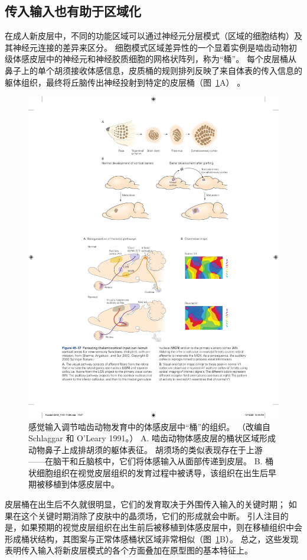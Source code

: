 \subsection{传入输入也有助于区域化}

在成人新皮层中，不同的功能区域可以通过神经元分层模式（区域的细胞结构）及其神经元连接的差异来区分。
细胞模式区域差异性的一个显着实例是啮齿动物初级体感皮层中的神经元和神经胶质细胞的网格状阵列，称为“桶”。
每个皮层桶从鼻子上的单个胡须接收体感信息，皮质桶的规则排列反映了来自体表的传入信息的躯体组织，最终将丘脑传出神经投射到特定的皮层桶（图~\ref{fig:45_16}A） 。


\begin{figure}[htbp]
	\centering
	\includegraphics[width=0.7\linewidth]{chap45/fig_45_16}
	\caption{感觉输入调节啮齿动物发育中的体感皮层中“桶”的组织。 （改编自 Schlaggar 和 O’Leary 1991。） A. 啮齿动物体感皮层的桶状区域形成动物鼻子上成排胡须的躯体表征。 胡须场的类似表现存在于上游——在脑干和丘脑核中，它们将体感输入从面部传递到皮层。 B. 桶状细胞组织在视觉皮层组织的发育过程中被诱导，该组织在出生后早期被移植到体感皮层中。}
	\label{fig:45_16}
\end{figure}


皮层桶在出生后不久就很明显，它们的发育取决于外围传入输入的关键时期；
如果在这个关键时期消除了皮肤中的晶须场，它们的形成就会中断。
引人注目的是，如果预期的视觉皮层组织在出生前后被移植到体感皮层中，则在移植组织中会形成桶状结构，其图案与正常体感桶状区域非常相似（图~\ref{fig:45_16}B）。
总之，这些发现表明传入输入将新皮层模式的各个方面叠加在原型图的基本特征上。


